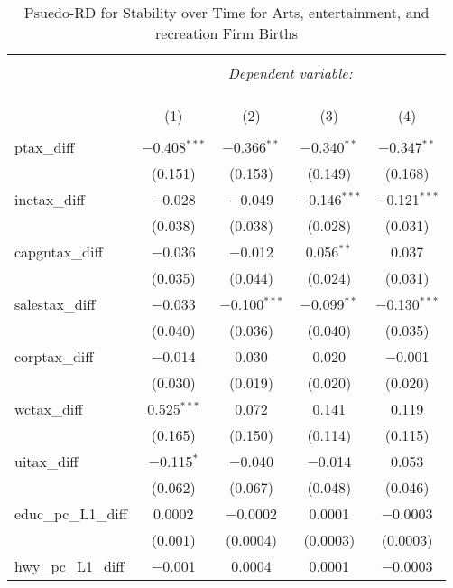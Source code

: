 
\begin{table}[!htbp] \centering 
  \caption{Psuedo-RD for Stability over Time for  Arts, entertainment, and recreation Firm Births} 
  \label{} 
\begin{tabular}{@{\extracolsep{5pt}}lcccc} 
\\[-1.8ex]\hline 
\hline \\[-1.8ex] 
 & \multicolumn{4}{c}{\textit{Dependent variable:}} \\ 
\cline{2-5} 
\\[-1.8ex] & \multicolumn{4}{c}{ } \\ 
\\[-1.8ex] & (1) & (2) & (3) & (4)\\ 
\hline \\[-1.8ex] 
 ptax\_diff & $-$0.408$^{***}$ & $-$0.366$^{**}$ & $-$0.340$^{**}$ & $-$0.347$^{**}$ \\ 
  & (0.151) & (0.153) & (0.149) & (0.168) \\ 
  inctax\_diff & $-$0.028 & $-$0.049 & $-$0.146$^{***}$ & $-$0.121$^{***}$ \\ 
  & (0.038) & (0.038) & (0.028) & (0.031) \\ 
  capgntax\_diff & $-$0.036 & $-$0.012 & 0.056$^{**}$ & 0.037 \\ 
  & (0.035) & (0.044) & (0.024) & (0.031) \\ 
  salestax\_diff & $-$0.033 & $-$0.100$^{***}$ & $-$0.099$^{**}$ & $-$0.130$^{***}$ \\ 
  & (0.040) & (0.036) & (0.040) & (0.035) \\ 
  corptax\_diff & $-$0.014 & 0.030 & 0.020 & $-$0.001 \\ 
  & (0.030) & (0.019) & (0.020) & (0.020) \\ 
  wctax\_diff & 0.525$^{***}$ & 0.072 & 0.141 & 0.119 \\ 
  & (0.165) & (0.150) & (0.114) & (0.115) \\ 
  uitax\_diff & $-$0.115$^{*}$ & $-$0.040 & $-$0.014 & 0.053 \\ 
  & (0.062) & (0.067) & (0.048) & (0.046) \\ 
  educ\_pc\_L1\_diff & 0.0002 & $-$0.0002 & 0.0001 & $-$0.0003 \\ 
  & (0.001) & (0.0004) & (0.0003) & (0.0003) \\ 
  hwy\_pc\_L1\_diff & $-$0.001 & 0.0004 & 0.0001 & $-$0.0003 \\ 

\end{tabular}
\end{table}
